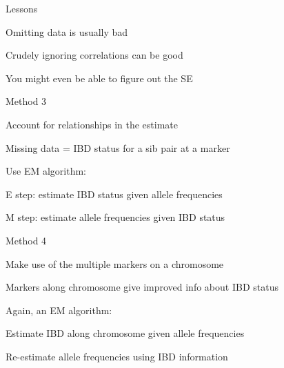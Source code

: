 \documentclass[aspectratio=169,12pt,t]{beamer}
\begin{document}
\begin{frame}{Lessons}

  \bbi
  \itemsep36pt
\item Omitting data is usually bad
\item Crudely ignoring correlations can be good
  \bi
\item[] You might even be able to figure out the SE
  \ei
  \ei


\note{
}

  \end{frame}



\begin{frame}{Method 3}

{\hilit Account for relationships in the estimate}

\bigskip \bigskip

Missing data = IBD status for a sib pair at a marker

\bigskip \bigskip

Use {\vhilit EM algorithm}:

\bigskip

\hspace*{15mm} \begin{minipage}{8in}
\bi
\item[\hilit E step:] estimate IBD status given allele frequencies

\item[\hilit M step:] estimate allele frequencies given IBD status
\ei
\end{minipage}


\note{
}

\end{frame}




\begin{frame}{Method 4}

{\hilit Make use of the multiple markers on a chromosome}

\bbi
\item Markers along chromosome give improved info
  about IBD status
\item Again, an EM algorithm:
  \bi
\item Estimate IBD along chromosome given allele frequencies
\item Re-estimate allele frequencies using IBD information
  \ei
\ei



\note{
}

\end{frame}
\end{document}
